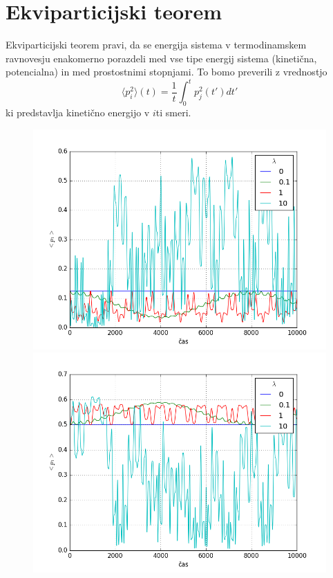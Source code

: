 \documentclass[slovene,11pt,a4paper]{article}
\numberwithin{equation}{section} %
\numberwithin{figure}{section} %
\numberwithin{table}{section} %
\begin{document}
\FloatBarrier

\section{Ekviparticijski teorem}
Ekviparticijski teorem pravi, da se energija sistema v termodinamskem ravnovesju enakomerno porazdeli med vse tipe energij sistema (kinetična, potencialna) in med prostostnimi stopnjami. To bomo preverili z vrednostjo
\begin{equation}
\langle p_i^2 \rangle (t) = \frac{1}{t} \int_0^t p_j^2 (t') dt'
\end{equation}
ki predstavlja kinetično energijo v $i$ti smeri.

\begin{figure}[!ht]
\centering
\begin{minipage}{0.5\textwidth}
\centering
\includegraphics[scale=0.45]{slike/ekviparticija1.png}
\end{minipage}\hfill
\begin{minipage}{0.5\textwidth}
\centering
\includegraphics[scale=0.45]{slike/ekviparticija2.png}

\end{minipage}
\end{figure}
\end{document}
